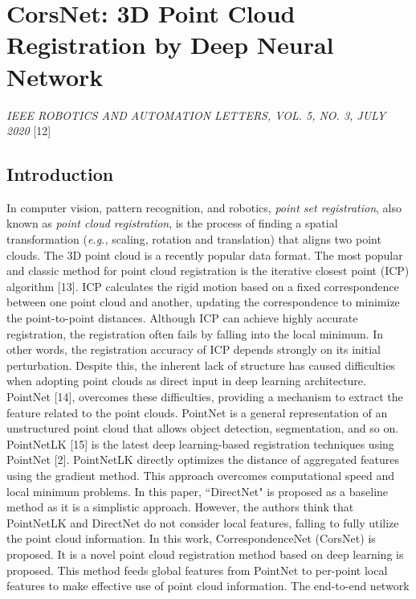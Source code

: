 \section{CorsNet: 3D Point Cloud Registration by Deep Neural
Network}\label{header-n534}

\emph{IEEE ROBOTICS AND AUTOMATION LETTERS, VOL. 5, NO. 3, JULY 2020}
{[}12{]}

\subsection{Introduction}\label{header-n536}

In computer vision, pattern recognition, and robotics, \emph{point set
registration}, also known as \emph{point cloud registration}, is the
process of finding a spatial transformation (\emph{e.g.,} scaling,
rotation and translation) that aligns two point clouds. The 3D point
cloud is a recently popular data format. The most popular and classic
method for point cloud registration is the iterative closest point (ICP)
algorithm {[}13{]}. ICP calculates the rigid motion based on a fixed
correspondence between one point cloud and another, updating the
correspondence to minimize the point-to-point distances. Although ICP
can achieve highly accurate registration, the registration often fails
by falling into the local minimum. In other words, the registration
accuracy of ICP depends strongly on its initial perturbation. Despite
this, the inherent lack of structure has caused difficulties when
adopting point clouds as direct input in deep learning architecture.
PointNet {[}14{]}, overcomes these difficulties, providing a mechanism
to extract the feature related to the point clouds. PointNet is a
general representation of an unstructured point cloud that allows object
detection, segmentation, and so on. PointNetLK {[}15{]} is the latest
deep learning-based registration techniques using PointNet {[}2{]}.
PointNetLK directly optimizes the distance of aggregated features using
the gradient method. This approach overcomes computational speed and
local minimum problems. In this paper, ``DirectNet" is proposed as a
baseline method as it is a simplistic approach. However, the authors
think that PointNetLK and DirectNet do not consider local features,
falling to fully utilize the point cloud information. In this work,
CorrespondenceNet (CorsNet) is proposed. It is a novel point cloud
registration method based on deep learning is proposed. This method
feeds global features from PointNet to per-point local features to make
effective use of point cloud information. The end-to-end network
